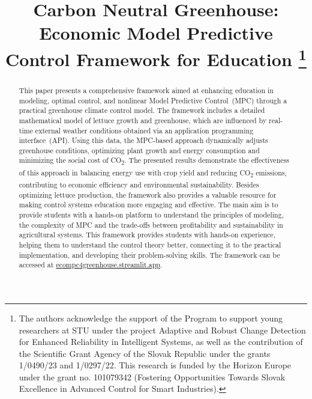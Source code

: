 \documentclass[conference]{IEEEtran}
\begin{document}
\title{\vspace*{18pt}Carbon Neutral Greenhouse: Economic Model Predictive Control Framework for Education
    \thanks{The authors acknowledge the support of the Program to support young researchers at STU under the project Adaptive and Robust Change Detection for Enhanced Reliability in Intelligent Systems, as well as the contribution of the Scientific Grant Agency of the Slovak Republic under the grants 1/0490/23 and 1/0297/22. This research is funded by the Horizon Europe under the grant no. 101079342 (Fostering Opportunities Towards Slovak Excellence in Advanced Control for Smart Industries).}
}

\author{
}

\maketitle

\begin{abstract}
    This paper presents a comprehensive framework aimed at enhancing education in modeling, optimal control, and nonlinear Model Predictive Control~(MPC) through a practical greenhouse climate control model. The framework includes a detailed mathematical model of lettuce growth and greenhouse, which are influenced by real-time external weather conditions obtained via an application programming interface~(API). Using this data, the MPC-based approach dynamically adjusts greenhouse conditions, optimizing plant growth and energy consumption and minimizing the social cost of CO\textsubscript{2}. The presented results demonstrate the effectiveness of this approach in balancing energy use with crop yield and reducing CO\textsubscript{2} emissions, contributing to economic efficiency and environmental sustainability.
    Besides optimizing lettuce production, the framework also provides a valuable resource for making control systems education more engaging and effective. The main aim is to provide students with a hands-on platform to understand the principles of modeling, the complexity of MPC and the trade-offs between profitability and sustainability in agricultural systems. This framework provides students with hands-on experience, helping them to understand the control theory better, connecting it to the practical implementation, and developing their problem-solving skills. The framework can be accessed at \url{ecompc4greenhouse.streamlit.app}.
\end{abstract}
\end{document}
